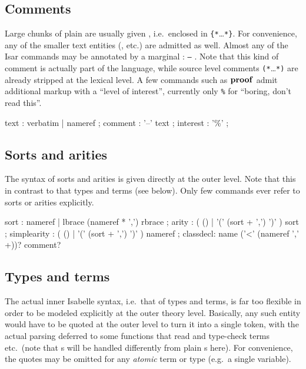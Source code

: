 \subsection{Comments}

Large chunks of plain  are usually given ,
i.e.\ enclosed in \verb|{*|\dots\verb|*}|.  For convenience, any of the
smaller text entities (,  etc.)  are
admitted as well.  Almost any of the Isar commands may be annotated by a
marginal : \texttt{--} .  Note that this
kind of comment is actually part of the language, while source level comments
\verb|(*|\dots\verb|*)| are already stripped at the lexical level.  A few
commands such as ${\mathord{\mathbf{proof}}}$ admit additional markup with a ``level of
interest'', currently only \texttt{\%} for ``boring, don't read this''.

\begin{rail}
  text : verbatim | nameref
  ;
  comment : '--' text
  ;
  interest : '\%'
  ;
\end{rail}


\subsection{Sorts and arities}

The syntax of sorts and arities is given directly at the outer level.  Note
that this in contrast to that types and terms (see below).  Only few commands
ever refer to sorts or arities explicitly.

\begin{rail}
  sort : nameref | lbrace (nameref * ',') rbrace
  ;
  arity : ( () | '(' (sort + ',') ')' ) sort
  ;
  simplearity : ( () | '(' (sort + ',') ')' ) nameref
  ;
  classdecl: name ('<' (nameref ',' +))? comment?
\end{rail}


\subsection{Types and terms}

The actual inner Isabelle syntax, i.e.\ that of types and terms, is far too
flexible in order to be modeled explicitly at the outer theory level.
Basically, any such entity would have to be quoted at the outer level to turn
it into a single token, with the actual parsing deferred to some functions
that read and type-check terms etc.\ (note that s will be
handled differently from plain s here).  For convenience, the
quotes may be omitted for any \emph{atomic} term or type (e.g.\ a single
variable).


